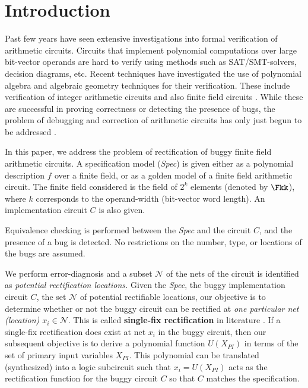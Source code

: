 \section{Introduction}

Past few years have seen extensive investigations into formal
verification of arithmetic circuits. Circuits that implement
polynomial computations over large bit-vector operands are hard to
verify using methods such as SAT/SMT-solvers, decision diagrams,
etc. Recent techniques have investigated the use of polynomial algebra
and algebraic geometry techniques for their verification. These
include verification of integer arithmetic circuits
\cite{Armin2017ColumnWiseVO} \cite{maciej:2015} \cite{rolf:2016} and
also finite field circuits \cite{lv:tcad2013}
\cite{blueveri:fmsd}. While these are successful in proving
correctness or detecting the presence of bugs, the problem of
debugging and correction of arithmetic circuits has only just begun to
be addressed \cite{farimah:2017:1,farimah:2016}. 

In this paper, we address the problem of rectification of buggy finite
field arithmetic circuits. A specification model ({\it Spec}) is given
either as a  polynomial description $f_{}$ over a finite field, or as a
golden model of a finite field arithmetic circuit. The finite field
considered is the field of $2^k$ elements (denoted by $\Fkk$), where
$k$ corresponds to the operand-width (bit-vector word length). An
  implementation circuit $C$ is also given. 

Equivalence checking is performed between the {\it Spec} and the
  circuit $C$, and the presence of a bug is detected. No restrictions
  on the number, type, or locations of the bugs are assumed.

We perform error-diagnosis and a subset   $\mathcal{N}$ of the nets of
the circuit is identified as {\it potential rectification locations.}
Given the {\it Spec}, the buggy implementation circuit $C$, the set
$\mathcal{N}$ of potential rectifiable locations, our objective is to determine
whether or not the buggy circuit can be rectified at {\it one
  particular net (location) $x_i\in \mathcal{N}$}. This is called {\bf
  single-fix rectification} in literature \cite{Huang:DAC2011}. If a
single-fix rectification does exist at net $x_i$ in the buggy circuit,
then our subsequent objective is to derive a polynomial function
$U(X_{PI})$ in terms of the set of primary input variables
$X_{PI}$. This polynomial can be translated (synthesized) into a logic
subcircuit such that $x_i = U(X_{PI})$ acts as the rectification
function for the buggy circuit $C$ so that $C$ matches the
specification. 

